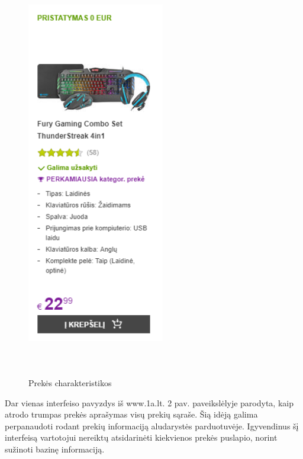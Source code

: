 \documentclass[oneside]{VUMIFPSkursinis}
\begin{document}
	
		  \begin{figure}[h]
			\centering
			\includegraphics[width=6cm,height=18cm,keepaspectratio]{IkvepiantisInterfeisas2.png}
			\caption{ Prekės charakteristikos}
		\end{figure}

			Dar vienas interfeiso pavyzdys iš www.1a.lt. 2 pav.
			 paveikslėlyje parodyta, kaip atrodo trumpas prekės aprašymas visų prekių sąraše.
			 Šią idėją galima perpanaudoti rodant prekių informaciją aludarystės parduotuvėje.
			 Igyvendinus šį interfeisą vartotojui nereiktų atsidarinėti kiekvienos prekės puslapio, norint sužinoti bazinę informaciją.

	\pagebreak
\end{document}
